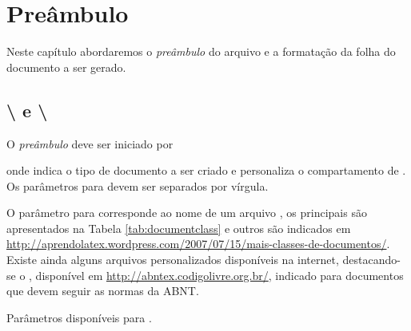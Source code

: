 % 
% 
% 
% 
% 
\chapter{Preâmbulo} \label{sch:latex:preamble}
Neste capítulo abordaremos o \textit{preâmbulo} do arquivo  e a formatação da folha do documento a ser gerado.

\section{\textbackslash{} e \textbackslash{}}

O \textit{preâmbulo} deve ser iniciado por
onde  indica o tipo de documento a ser criado e  personaliza o compartamento de . Os parâmetros para  devem ser separados por vírgula.

O parâmetro para  corresponde ao nome de um arquivo , os principais são apresentados na Tabela \ref{tab:documentclass} e outros são indicados em \url{http://aprendolatex.wordpress.com/2007/07/15/mais-classes-de-documentos/}. Existe ainda alguns arquivos  personalizados disponíveis na internet, destacando-se o , disponível em \url{http://abntex.codigolivre.org.br/}, indicado para documentos que devem seguir as normas da ABNT.
\begin{table}[h!tb]
    \centering
    \caption{Parâmetros disponíveis para .} \label{tab:documentclass}
    
\end{table}

